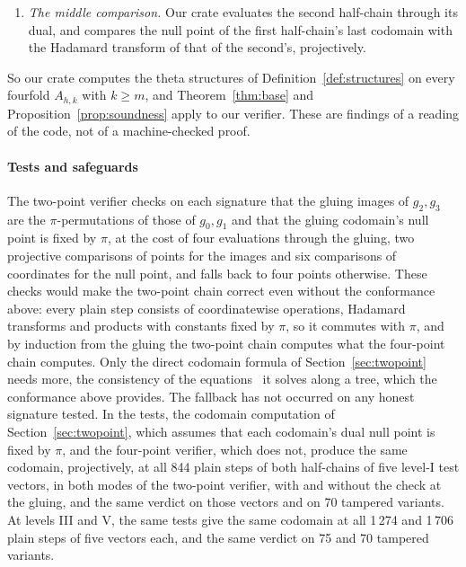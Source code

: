 \documentclass[version=preprint]{iacrcc}
\newcommand{\Ecom}{E_{\mathrm{com}}}
\begin{document}
\begin{remark}[Conformance]
\begin{enumerate}[label=(\alph*), resume]
            $(R_0, 0, 0, 0)$, for the first point $R_0$ of the hinted basis of
            $\Ecom[2^f]$, the point from which it derives $R$; it compares the
            $x$-coordinates of the first two components of the image with
            those of $[a_1]R_0$ and $[a_2]R_0$, and requires the fourth to be the
            point at infinity, as Proposition~\ref{prop:soundness} assumes.
            \item \emph{The middle comparison.} Our crate evaluates the second
            half-chain through its dual, and compares the null point of the
            first half-chain's last codomain with the Hadamard transform of
            that of the second's, projectively.
        \end{enumerate}
        So our crate computes the theta structures of
        Definition~\ref{def:structures} on every fourfold $A_{h,k}$ with $k \ge
        m$, and Theorem~\ref{thm:base} and Proposition~\ref{prop:soundness} apply
        to our verifier. These are
        findings of a reading of the code, not of a machine-checked proof.
    \end{remark}

    \paragraph{Tests and safeguards}
    The two-point verifier checks on each signature that the gluing images of
    $g_2, g_3$ are the $\pi$-permutations of those of $g_0, g_1$ and that the
    gluing codomain's null point is fixed by $\pi$, at the cost of four
    evaluations through the gluing, two projective comparisons of points for
    the images and six comparisons of coordinates for the null point, and
    falls back to four points otherwise. These checks would make the two-point chain correct even
    without the conformance above: every plain step consists of coordinatewise
    operations, Hadamard transforms and products with constants fixed by $\pi$,
    so it commutes with $\pi$, and by induction from the gluing the two-point
    chain computes what the four-point chain computes. Only the direct codomain
    formula of Section~\ref{sec:twopoint} needs more, the consistency of the
    equations~\cite[Eq.~(21)]{Dar24} it solves along a tree, which the
    conformance above provides. The
    fallback has not occurred on any honest signature tested. In the tests, the
    codomain computation of Section~\ref{sec:twopoint}, which assumes that each
    codomain's dual null point is fixed by $\pi$, and the four-point verifier,
    which does not, produce the same codomain, projectively, at all 844
    plain steps of both half-chains of five level-I test vectors, in both
    modes of the two-point verifier, with and without the check at the gluing, and the same
    verdict on those vectors and on 70 tampered variants. At levels III and V, the same tests give the same codomain at all
    1\,274 and 1\,706 plain steps of five vectors each, and the same verdict on 75 and 70 tampered variants.
\end{document}
